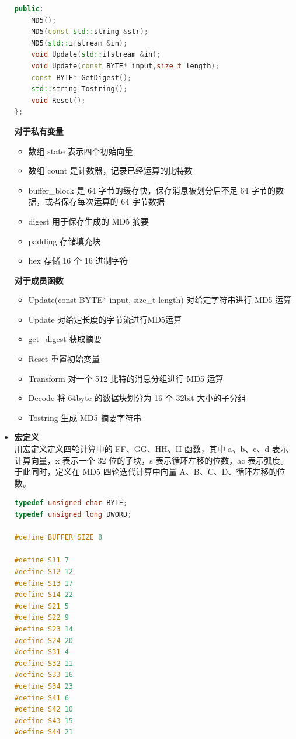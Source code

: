 \documentclass[UTF8,a4paper,10pt]{ctexart}
\begin{document}
\begin{itemize}
\begin{lstlisting}[language = C++]
public:
    MD5(); 
    MD5(const std::string &str); 
    MD5(std::ifstream &in); 
    void Update(std::ifstream &in);
    void Update(const BYTE* input,size_t length);
    const BYTE* GetDigest(); 
    std::string Tostring(); 
    void Reset(); 
};
    \end{lstlisting}
    \textbf{对于私有变量}
    \begin{itemize}
        \item 数组 state 表示四个初始向量
        \item 数组 count 是计数器，记录已经运算的比特数
        \item buffer\_block 是 64 字节的缓存快，保存消息被划分后不足 64 字节的数据，或者保存每次运算的 64 字节数据
        \item digest 用于保存生成的 MD5 摘要
        \item padding 存储填充块
        \item hex 存储 16 个 16 进制字符
    \end{itemize}
    \textbf{对于成员函数}
    \begin{itemize}
        \item Update(const BYTE* input, size\_t length) 对给定字符串进行 MD5 运算
        \item Update 对给定长度的字节流进行MD5运算
        \item get\_digest 获取摘要
        \item Reset 重置初始变量
        \item Transform 对一个 512 比特的消息分组进行 MD5 运算
        \item Decode 将 64byte 的数据块划分为 16 个 32bit 大小的子分组
        \item Tostring 生成 MD5 摘要字符串
    \end{itemize}
    \item \textbf{宏定义}\\
    用宏定义定义四轮计算中的 FF、GG、HH、II 函数，其中 a、b、c、d 表示计算向量，x 表示一个 32 位的子块，s 表示循环左移的位数，ac 表示弧度。于此同时，定义在 MD5 四轮迭代计算中向量 A、B、C、D、循环左移的位数。
    \begin{lstlisting}[language = C++]
typedef unsigned char BYTE;
typedef unsigned long DWORD;

#define BUFFER_SIZE 8

#define S11 7
#define S12 12
#define S13 17
#define S14 22
#define S21 5
#define S22 9
#define S23 14
#define S24 20
#define S31 4
#define S32 11
#define S33 16
#define S34 23
#define S41 6
#define S42 10
#define S43 15
#define S44 21


\end{lstlisting}
\end{itemize}
\end{document}
